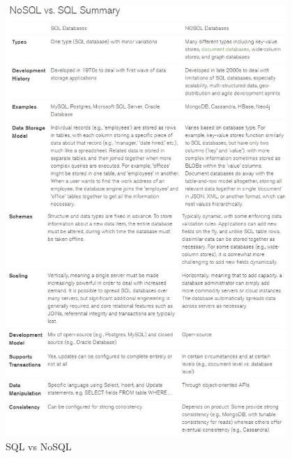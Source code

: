 \documentclass[a4paper,12pt]{foi}
\begin{document}
\begin{figure}[h]
\centering 
\includegraphics[width=0.95\textwidth]{sql_vs_nosql.jpg}
\caption{SQL vs NoSQL \citep{}}
\label{slika-1}
\end{figure}
\end{document}
